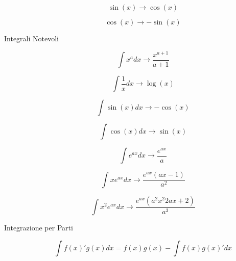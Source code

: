 \begin{description}
		\begin{equation}
		\sin(x) \rightarrow \cos(x)
		\end{equation}
		
		\begin{equation}
		\cos(x) \rightarrow -\sin(x)
		\end{equation}
	
	\item[Integrali Notevoli]
		\begin{equation}
		\int x^{a} dx \rightarrow \frac{x^{a+1}}{a+1}
		\end{equation}
		
		\begin{equation}
		\int \frac{1}{x} dx \rightarrow \log(x)
		\end{equation}
		
		\begin{equation}
		\int \sin(x) dx \rightarrow -\cos(x)
		\end{equation}
		
		\begin{equation}
		\int \cos(x) dx \rightarrow \sin(x)
		\end{equation}
		
		\begin{equation}
		\int e^{ax} dx \rightarrow \frac{e^{ax}}{a}
		\end{equation}
		
		\begin{equation}
		\int xe^{ax} dx \rightarrow \frac{e^{ax}(ax-1)}{a^{2}}
		\end{equation}
		
		\begin{equation}
		\int x^{2}e^{ax} dx \rightarrow \frac{e^{ax}(a^{2}x^{2}2ax+2)}{a^{3}}
		\end{equation}
	
	\item[Integrazione per Parti]
		\begin{equation}
		\int f(x)'g(x) dx = f(x)g(x) - \int f(x)g(x)'dx
		\end{equation}
	
\end{description}
\newpage

